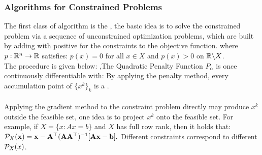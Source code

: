 \documentclass[10pt]{report}
\begin{document}
\subsubsection{Algorithms for Constrained Problems}
The first class of algorithm is the , the basic idea is to solve the constrained
problem via a sequence of unconstrained optimization problems, which are built by adding 
with positive  for the constraints to the objective function.
where $p:\RR^n\to\RR$ satisfies: $p(x)=0$ for all $x\in X$ and $p(x)>0$ on $\RR \backslash X$.\\
The procedure is given below:
\sep{The Quadratic Penalty Function}
$P_\alpha$ is once continuously differentiable with:
By applying the penalty method, every accumulation point of $\{x^k\}_k$ is a .\\
\\
Applying the gradient method to the constraint problem directly may produce $x^k$ outside the feasible set, one idea is
to project $x^k$ onto the feasible set.
For example, if $X=\{x:Ax=b\}$ and $X$ has full row rank, then it holds that:
$\mathcal{P}_X(\mathbf{x})=\mathbf{x}-\mathbf{A}^\top(\mathbf{A}\mathbf{A}^\top)^{-1}[\mathbf{A}\mathbf{x}-\mathbf{b}].$
Different constraints correspond to different $\mathcal{P}_X(x)$.
\end{document}
